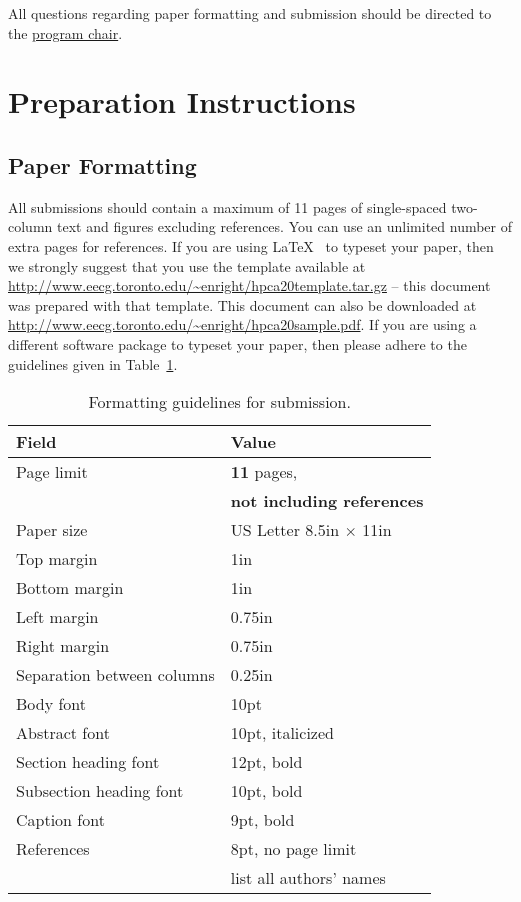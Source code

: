 \documentclass[pageno]{jpaper}
\begin{document}
All questions regarding paper formatting and submission should be directed to
the \href{mailto:enright@eecg.toronto.edu}{program chair}.

\section{Preparation Instructions}

\subsection{Paper Formatting}

All submissions should contain a maximum of 11 pages of single-spaced
two-column text and figures excluding references. You can use an unlimited number of extra pages for references. 
If you are using \LaTeX~\cite{lamport94} 
to typeset your paper, then we 
strongly suggest
that you use the template available at
\url{http://www.eecg.toronto.edu/~enright/hpca20template.tar.gz} -- this
document was prepared with that template.  This document can
also be downloaded at \url{http://www.eecg.toronto.edu/~enright/hpca20sample.pdf}.
If you are using a different
software package to typeset your paper, then please adhere to the guidelines
given in Table~\ref{table:formatting}.

\begin{table}[h!]
  \centering
  \begin{tabular}{|l|l|}
    \hline
    \textbf{Field} & \textbf{Value}\\
    \hline
    \hline
    Page limit & {\bf 11} pages, \\
& {\bf not including references}\\
    \hline
    Paper size & US Letter 8.5in $\times$ 11in\\
    \hline
    Top margin & 1in\\
    \hline
    Bottom margin & 1in\\
    \hline
    Left margin & 0.75in\\
    \hline
    Right margin & 0.75in\\
    \hline
    Separation between columns & 0.25in\\
    \hline
    Body font & 10pt\\
    \hline
    Abstract font & 10pt, italicized\\
    \hline
    Section heading font & 12pt, bold\\
    \hline
    Subsection heading font & 10pt, bold\\
    \hline
    Caption font & 9pt, bold\\
    \hline
    References & 8pt, no page limit\\
& list all authors' names \\
    \hline
  \end{tabular}
  \caption{Formatting guidelines for submission.}
  \label{table:formatting}
\end{table}
\end{document}
